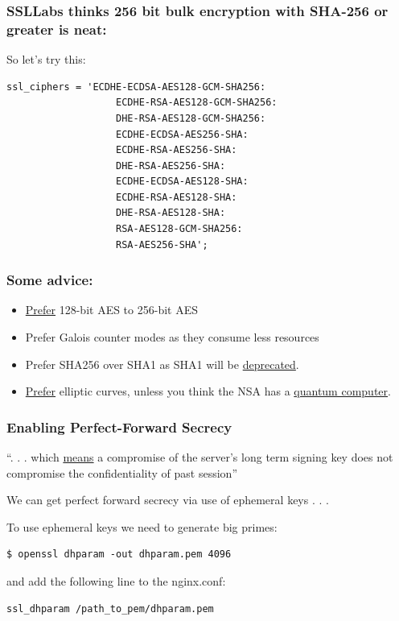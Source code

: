 \documentclass[9pt]{beamer}
\begin{document}
\begin{frame}[fragile]
\frametitle{SSLLabs thinks 256 bit bulk encryption with SHA-256 or greater is neat:}
So let's try this:
\begin{verbatim}
ssl_ciphers = 'ECDHE-ECDSA-AES128-GCM-SHA256:
                   ECDHE-RSA-AES128-GCM-SHA256:
                   DHE-RSA-AES128-GCM-SHA256:
                   ECDHE-ECDSA-AES256-SHA:
                   ECDHE-RSA-AES256-SHA:
                   DHE-RSA-AES256-SHA:
                   ECDHE-ECDSA-AES128-SHA:
                   ECDHE-RSA-AES128-SHA:
                   DHE-RSA-AES128-SHA:
                   RSA-AES128-GCM-SHA256:
                   RSA-AES256-SHA';   
\end{verbatim}
\end{frame}

\begin{frame}
\frametitle{Some advice:}
\begin{itemize}
\item \href{https://www.schneier.com/blog/archives/2009/07/another_new_aes.html}{Prefer} 128-bit AES to 256-bit AES
\item Prefer Galois counter modes as they consume less resources
\item Prefer SHA256 over SHA1 as SHA1 will be \href{http://googleonlinesecurity.blogspot.com/2014/09/gradually-sunsetting-sha-1.html}{deprecated}.
\item \href{https://www.nsa.gov/business/programs/elliptic_curve.shtml}{Prefer} elliptic curves, unless you think the NSA has a \href{https://en.wikipedia.org/wiki/Elliptic_curve_cryptography}{quantum computer}.
\end{itemize}
\end{frame}

\begin{frame}[fragile]
\frametitle{Enabling Perfect-Forward Secrecy}
 ``. . . which \href{https://www.owasp.org/index.php/Transport_Layer_Protection_Cheat_Sheet}{means} a compromise of the server's long term signing key does not compromise the confidentiality of past session''
 
 We can get perfect forward secrecy via use of ephemeral keys . . .
\end{frame}

\begin{frame}[fragile]
To use ephemeral keys we need to generate big primes:
\begin{verbatim}
$ openssl dhparam -out dhparam.pem 4096
\end{verbatim}
and add the following line to the nginx.conf:
\begin{verbatim}
ssl_dhparam /path_to_pem/dhparam.pem
\end{verbatim}
\end{frame}
\end{document}

